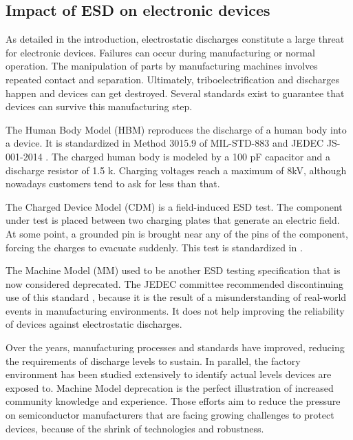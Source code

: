 \subsection{Impact of ESD on electronic devices}

As detailed in the introduction, electrostatic discharges constitute a large threat for electronic devices.
Failures can occur during manufacturing or normal operation.
The manipulation of parts by manufacturing machines involves repeated contact and separation.
Ultimately, triboelectrification and discharges happen and devices can get destroyed.
Several standards exist to guarantee that devices can survive this manufacturing step.

The Human Body Model (HBM) reproduces the discharge of a human body into a device.
It is standardized in Method 3015.9 of MIL-STD-883 \cite{MIL-STD-883} and JEDEC JS-001-2014 \cite{jedec-001}.
The charged human body is modeled by a 100 pF capacitor and a discharge resistor of 1.5 k\textOmega{}.
Charging voltages reach a maximum of 8kV, although nowadays customers tend to ask for less than that.

The Charged Device Model (CDM) is a field-induced ESD test.
The component under test is placed between two charging plates that generate an electric field.
At some point, a grounded pin is brought near any of the pins of the component, forcing the charges to evacuate suddenly.
This test is standardized in \cite{jedec-002}.

The Machine Model (MM) used to be another ESD testing specification that is now considered deprecated.
The JEDEC committee recommended discontinuing use of this standard \cite{discontinued-mm}, because it is the result of a misunderstanding of real-world events in manufacturing environments.
It does not help improving the reliability of devices against electrostatic discharges.


%
Over the years, manufacturing processes and standards have improved, reducing the requirements of discharge levels to sustain.
In parallel, the factory environment has been studied extensively to identify actual levels devices are exposed to.
Machine Model deprecation is the perfect illustration of increased community knowledge and experience.
Those efforts aim to reduce the pressure on semiconductor manufacturers that are facing growing challenges to protect devices, because of the shrink of technologies and robustness.

